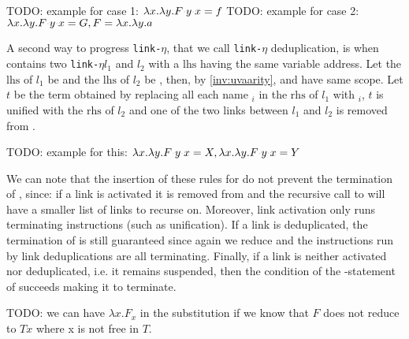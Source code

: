 \documentclass[sigconf,natbib=false,review]{acmart}
\newcommand{\appsep}{\ensuremath{\textcolor{lightgray}{\cdot}}}
\newcommand{\UnifRel}{\ensuremath{\simeq}}
\newcommand{\Ue}{\ensuremath{\UnifRel_\lambda}\xspace}
\newcommand{\linketa}{\texttt{link-}\ensuremath{\eta}\xspace}
\newcommand{\lhs}{\ensuremath{\mathrm{lhs}}\xspace}
\newcommand{\rhs}{\ensuremath{\mathrm{rhs}}\xspace}
\begin{document}
TODO: example for case 1: $\lambda x. \lambda y. F \appsep y \appsep x = f$
TODO: example for case 2: $\lambda x. \lambda y. F \appsep y \appsep x = G, F = \lambda x. \lambda y. a$

A second way to progress \linketa, that we call \linketa deduplication, is when
\linkStore contains two \linketa $l_1$ and $l_2$ with a \lhs having the same
variable address. Let the \lhs of $l_1$ be  and the \lhs of
$l_2$ be , then, by \cref{inv:uvaarity}, 
and  have same scope. Let $t$ be the term obtained by replacing all
each name $_i$ in the \rhs of $l_1$ with $_i$, $t$ is
unified with the \rhs of $l_2$ and one of the two links between $l_1$ and $l_2$
is removed from \linkStore. 

TODO: example for this: $\lambda x. \lambda y. F \appsep y \appsep x = X,
\lambda x. \lambda y. F \appsep y \appsep x = Y$

We can note that the insertion of these rules for  do not
prevent the termination of , since: if a link is activated it
is removed from \linkStore and the recursive call to  will have
a smaller list of links to recurse on. Moreover, link activation only runs
terminating instructions (such as unification). If a link is deduplicated, the
termination of  is still guaranteed since again we reduce
\linkStore and the instructions run by link deduplications are all terminating.
Finally, if a link is neither activated nor deduplicated, i.e. it remains
suspended, then the condition of the -statement of 
succeeds making it to terminate.

TODO: we can have $\lambda x. F_x$ in the substitution if we know that $F$ does
not reduce to $T x$ where x is not free in $T$.


\end{document}
